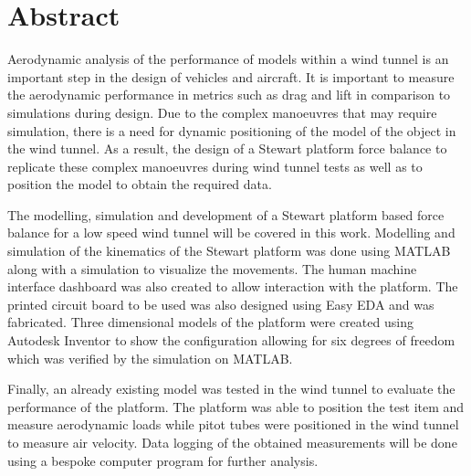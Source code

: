 
\section*{Abstract}
\label{sec:Abstract}
Aerodynamic analysis of the performance of models within a wind tunnel is an important step in the design of vehicles and aircraft. It is important to measure the aerodynamic performance in metrics such as drag and lift in comparison to simulations during design.
Due to the complex manoeuvres that may require simulation, there is a need for dynamic positioning of the model of the object in the wind tunnel. As a result, the design of a Stewart platform force balance to replicate these complex manoeuvres during wind tunnel tests as well as to position the model to obtain the required data.

The modelling, simulation and development of a Stewart platform
based force balance for a low speed wind tunnel will be covered in this work.
Modelling and simulation of the kinematics of the Stewart platform was done using MATLAB along with a simulation to visualize the movements. 
The human machine interface dashboard was also created to allow interaction with the platform. The printed circuit board to be used was also designed using Easy EDA and was fabricated. Three dimensional models of the platform were created using Autodesk Inventor to show the configuration allowing for six degrees of freedom which was verified by the simulation on MATLAB.

Finally, an already existing model was tested in the wind tunnel to evaluate the performance
of the platform. The platform was able to position the test
item and measure aerodynamic loads while pitot tubes were positioned in the wind tunnel to measure air velocity.
 Data logging of the obtained measurements will be done using a bespoke computer program for further analysis.


